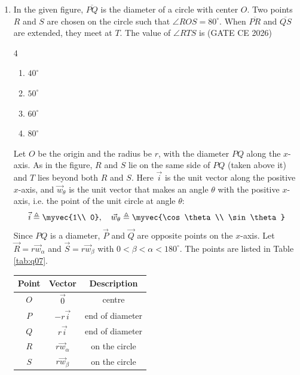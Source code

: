 \begin{enumerate}[label=\thesubsection.\arabic*, ref=\thesubsection.\theenumi, itemsep=0pt, leftmargin=*]
\item In the given figure, $\overline{PQ}$ is the diameter of a circle with center $O$. Two points $R$ and $S$ are chosen on the circle such that $\angle ROS = 80^\circ$. When $\overline{PR}$ and $\overline{QS}$ are extended, they meet at $T$. The value of $\angle RTS$ is \underline{\hspace{2cm}} \hfill (GATE CE 2026)
\begin{multicols}{4}
\begin{enumerate}[label=\alph*), itemsep=0pt]
\item $40^\circ$
\item $50^\circ$
\item $60^\circ$
\item $80^\circ$
\end{enumerate}
\end{multicols}
\solution Let $O$ be the origin and the radius be $r$, with the diameter $PQ$ along the $x$-axis. As in the figure, $R$ and $S$ lie on the same side of $PQ$ (taken above it) and $T$ lies beyond both $R$ and $S$. Here $\vec{i}$ is the unit vector along the positive $x$-axis, and $\vec{w}_\theta$ is the unit vector that makes an angle $\theta$ with the positive $x$-axis, i.e. the point of the unit circle at angle $\theta$:
\begin{align}
\vec{i} \triangleq \myvec{1\\ 0},\quad \vec{w}_\theta \triangleq \myvec{\cos\theta\\ \sin\theta}
\end{align}
Since $PQ$ is a diameter, $\vec{P}$ and $\vec{Q}$ are opposite points on the $x$-axis. Let $\vec{R} = r\vec{w}_\alpha$ and $\vec{S} = r\vec{w}_\beta$ with $0 < \beta < \alpha < 180^\circ$. The points are listed in Table \ref{tab:q07}.
\begin{table}[H]
\centering
\begin{tabular}{|c|c|c|}
\hline
\textbf{Point} & \textbf{Vector} & \textbf{Description}\\ \hline
$O$ & $\vec{0}$ & centre\\ \hline
$P$ & $-r\vec{i}$ & end of diameter\\ \hline
$Q$ & $r\vec{i}$ & end of diameter\\ \hline
$R$ & $r\vec{w}_\alpha$ & on the circle\\ \hline
$S$ & $r\vec{w}_\beta$ & on the circle\\ \hline
\end{tabular}

\end{table}
\end{enumerate}
